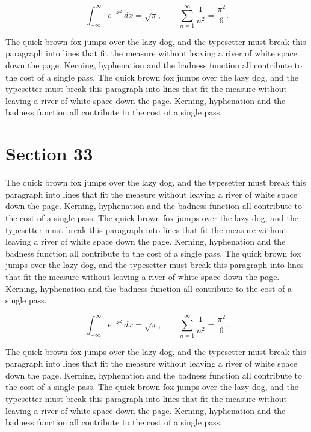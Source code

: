 \documentclass{article}
\begin{document}
\begin{equation}
\int_{-\infty}^{\infty} e^{-x^{2}}\,dx = \sqrt{\pi}, \qquad
\sum_{n=1}^{\infty} \frac{1}{n^{2}} = \frac{\pi^{2}}{6}.
\end{equation}

The quick brown fox jumps over the lazy dog, and the typesetter must break this paragraph into lines that fit the measure without leaving a river of white space down the page. Kerning, hyphenation and the badness function all contribute to the cost of a single pass. The quick brown fox jumps over the lazy dog, and the typesetter must break this paragraph into lines that fit the measure without leaving a river of white space down the page. Kerning, hyphenation and the badness function all contribute to the cost of a single pass. 
\section{Section 33}
The quick brown fox jumps over the lazy dog, and the typesetter must break this paragraph into lines that fit the measure without leaving a river of white space down the page. Kerning, hyphenation and the badness function all contribute to the cost of a single pass. The quick brown fox jumps over the lazy dog, and the typesetter must break this paragraph into lines that fit the measure without leaving a river of white space down the page. Kerning, hyphenation and the badness function all contribute to the cost of a single pass. The quick brown fox jumps over the lazy dog, and the typesetter must break this paragraph into lines that fit the measure without leaving a river of white space down the page. Kerning, hyphenation and the badness function all contribute to the cost of a single pass. 

\begin{equation}
\int_{-\infty}^{\infty} e^{-x^{2}}\,dx = \sqrt{\pi}, \qquad
\sum_{n=1}^{\infty} \frac{1}{n^{2}} = \frac{\pi^{2}}{6}.
\end{equation}

The quick brown fox jumps over the lazy dog, and the typesetter must break this paragraph into lines that fit the measure without leaving a river of white space down the page. Kerning, hyphenation and the badness function all contribute to the cost of a single pass. The quick brown fox jumps over the lazy dog, and the typesetter must break this paragraph into lines that fit the measure without leaving a river of white space down the page. Kerning, hyphenation and the badness function all contribute to the cost of a single pass. 
\end{document}
